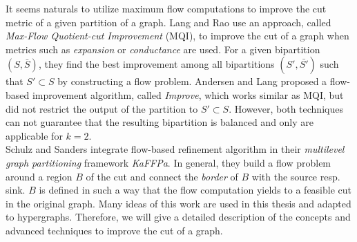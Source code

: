 It seems naturals to utilize maximum flow computations to improve the cut metric of a 
given partition of a graph. Lang and Rao \cite{lang2004flow} use an approach,
called \emph{Max-Flow Quotient-cut Improvement} (MQI), to improve the cut
of a graph when metrics such as \emph{expansion} or \emph{conductance}
are used. For a given bipartition $(S,\bar{S})$, they find the best 
improvement among all bipartitions $(S',\bar{S'})$ such that $S' \subset S$
by constructing a flow problem. Andersen and Lang \cite{andersen2008algorithm}
proposed a flow-based improvement algorithm, called \emph{Improve},
which works similar as MQI, but did not restrict the output of the 
partition to $S' \subset S$. However, both techniques can not guarantee 
that the resulting bipartition is balanced and only are applicable for $k=2$. \\
Schulz and Sanders \cite{sanders2011engineering} integrate flow-based refinement algorithm 
in their \emph{multilevel graph partitioning} framework \emph{KaFFPa}. In general,
they build a flow problem around a region $B$ of the cut and connect the \emph{border} 
of $B$ with the source resp. sink. $B$ is defined in such a way that the flow computation
yields to a feasible cut in the original graph. Many ideas of this work are used in this
thesis and adapted to hypergraphs. Therefore, we will give a detailed description
of the concepts and advanced techniques to improve the cut of a graph.

